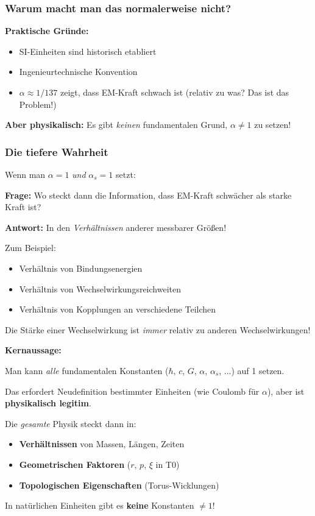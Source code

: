 \subsubsection{Warum macht man das normalerweise nicht?}

\textbf{Praktische Gründe:}
\begin{itemize}[nosep]
	\item SI-Einheiten sind historisch etabliert
	\item Ingenieurtechnische Konvention
	\item $\alpha \approx 1/137$ zeigt, dass EM-Kraft schwach ist (relativ zu was? Das ist das Problem!)
\end{itemize}

\textbf{Aber physikalisch:} Es gibt \textit{keinen} fundamentalen Grund, $\alpha \neq 1$ zu setzen!

\subsubsection{Die tiefere Wahrheit}

Wenn man $\alpha = 1$ \textit{und} $\alpha_s = 1$ setzt:

\textbf{Frage:} Wo steckt dann die Information, dass EM-Kraft schwächer als starke Kraft ist?

\textbf{Antwort:} In den \textit{Verhältnissen} anderer messbarer Größen!

Zum Beispiel:
\begin{itemize}[nosep]
	\item Verhältnis von Bindungsenergien
	\item Verhältnis von Wechselwirkungsreichweiten
	\item Verhältnis von Kopplungen an verschiedene Teilchen
\end{itemize}

Die Stärke einer Wechselwirkung ist \textit{immer} relativ zu anderen Wechselwirkungen!

\begin{keypoint}
	\textbf{Kernaussage:}
	
	Man kann \textit{alle} fundamentalen Konstanten ($\hbar$, $c$, $G$, $\alpha$, $\alpha_s$, ...) auf 1 setzen.
	
	Das erfordert Neudefinition bestimmter Einheiten (wie Coulomb für $\alpha$), aber ist \textbf{physikalisch legitim}.
	
	Die \textit{gesamte} Physik steckt dann in:
	\begin{itemize}[nosep]
		\item \textbf{Verhältnissen} von Massen, Längen, Zeiten
		\item \textbf{Geometrischen Faktoren} ($r$, $p$, $\xi$ in T0)
		\item \textbf{Topologischen Eigenschaften} (Torus-Wicklungen)
	\end{itemize}
	
	In natürlichen Einheiten gibt es \textbf{keine} Konstanten $\neq 1$!
\end{keypoint}


